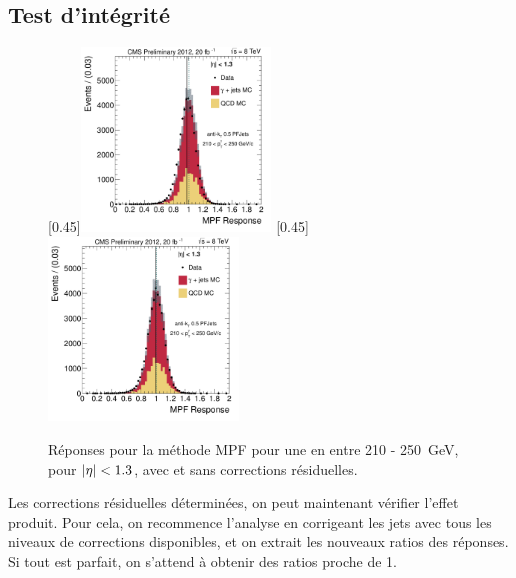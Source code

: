 \subsection{Test d'intégrité}


\begin{figure}[tbp]
    \centering
    [0.45\textwidth]{\includegraphics[width=0.45\textwidth]{chapitre4/figs/resp_mpf_eta013_ptPhot_210_250.pdf}} \qquad
    [0.45\textwidth]{\includegraphics[width=0.45\textwidth]{chapitre4/figs/resp_mpf_eta013_ptPhot_210_250_residuals.pdf}}
    \caption{Réponses pour la méthode MPF pour une en \ptg entre 210 - \SI{250}{\GeV}, pour $\lvert \eta \rvert < \num{1.3}$, avec et sans corrections résiduelles.}
    \label{fig:comp_mpf_residuals}
\end{figure}

Les corrections résiduelles déterminées, on peut maintenant vérifier l'effet produit. Pour cela, on recommence l'analyse en corrigeant les jets avec tous les niveaux de corrections disponibles, et on extrait les nouveaux ratios des réponses. Si tout est parfait, on s'attend à obtenir des ratios proche de 1.

